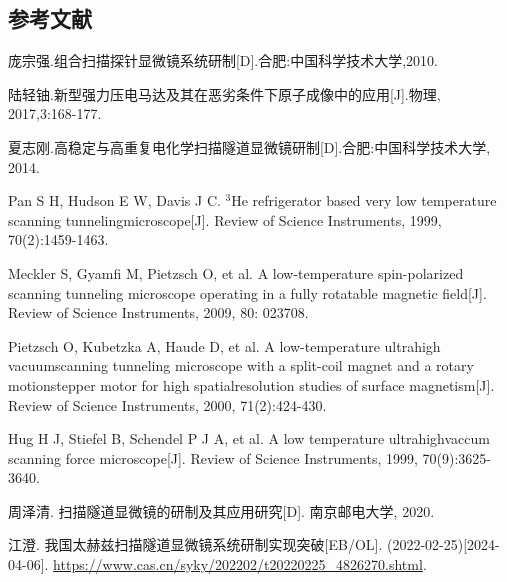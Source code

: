 \documentclass{article}
\begin{document}
\begin{spacing}{1.625}
	
	
\newpage
{}
\section*{参考文献} %
\renewcommand{\section}[2]{}
%
\begin{thebibliography}{25}
	 庞宗强.组合扫描探针显微镜系统研制[D].合肥:中国科学技术大学,2010.
	
	 陆轻铀.新型强力压电马达及其在恶劣条件下原子成像中的应用[J].物理, 2017,3:168-177.
	
	 夏志刚.高稳定与高重复电化学扫描隧道显微镜研制[D].合肥:中国科学技术大学, 2014.
	
	 Pan S H, Hudson E W, Davis J C. $^\text{3}$He refrigerator based very low temperature scanning tunnelingmicroscope[J]. Review of Science Instruments, 1999, 70(2):1459-1463.
	
	 Meckler S, Gyamfi M, Pietzsch O, et al. A low-temperature spin-polarized scanning tunneling microscope operating in a fully rotatable magnetic field[J]. Review of Science Instruments, 2009, 80: 023708.
	
	 Pietzsch O, Kubetzka A, Haude D, et al. A low-temperature ultrahigh vacuumscanning tunneling microscope with a split-coil magnet and a rotary motionstepper motor for high spatialresolution studies of surface magnetism[J]. Review of Science Instruments, 2000, 71(2):424-430.
	
	Hug H J, Stiefel B, Schendel P J A, et al. A low temperature ultrahighvaccum scanning force microscope[J]. Review of Science Instruments, 1999, 70(9):3625-3640.
	
	 周泽清. 扫描隧道显微镜的研制及其应用研究[D]. 南京邮电大学, 2020.
	
	 江澄. 我国太赫兹扫描隧道显微镜系统研制实现突破[EB/OL]. (2022-02-25)[2024-04-06]. \href{https://www.cas.cn/syky/202202/t20220225\_4826270.shtml}{https://www.cas.cn/syky/202202/t20220225\_4826270.shtml}.
	

\end{thebibliography}
\end{spacing}
\end{document}
